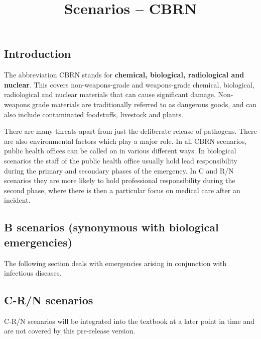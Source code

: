 \documentclass{article}
\begin{document}
\title{Scenarios – CBRN}

\maketitle


\subsection{Introduction}\label{H2656935}



The abbreviation CBRN stands for \textbf{chemical, biological, radiological and nuclear}. This covers non-weapons-grade and weapons-grade chemical, biological, radiological and nuclear materials that can cause significant damage. Non-weapons grade materials are traditionally referred to as dangerous goods, and can also include contaminated foodstuffs, livestock and plants.


There are many threats apart from just the deliberate release of pathogens. There are also environmental factors which play a major role. In all CBRN scenarios, public health offices can be called on in various different ways. In biological scenarios the staff of the public health office usually hold lead responsibility during the primary and secondary phases of the emergency. In C and R/N scenarios they are more likely to hold professional responsibility during the second phase, where there is then a particular focus on medical care after an incident.


\subsection{B scenarios (synonymous with biological emergencies)}\label{H411227}



The following section deals with emergencies arising in conjunction with infectious diseases.


\subsection{C-R/N scenarios}\label{H5103505}



C-R/N scenarios will be integrated into the textbook at a later point in time and are not covered by this pre-release version.
\end{document}
